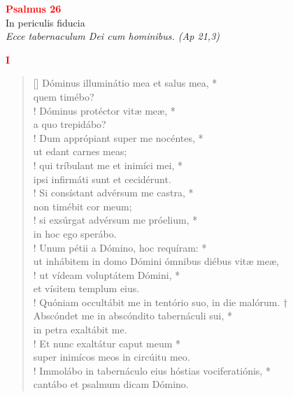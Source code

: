 


\def\greinitialformat#1{%
{\fontsize{39}{39}\selectfont #1}%
}




\vspace{0.3cm}
\begin{center}
 \textcolor{red}{\large \bf Psalmus 26}\\
In periculis fiducia\\
\textit{\small Ecce tabernaculum Dei cum hominibus. (Ap 21,3)}
\end{center}
\begin{center}
 \textcolor{red}{\bf I}
\end{center}
\begin{verse}[\versewidth]
Dóminus illuminátio mea et salus mea, *\\
quem timébo?\\!
\vin Dóminus protéctor vitæ meæ, *\\
\vin a quo trepidábo?\\!
Dum apprópiant super me nocéntes, *\\
ut edant carnes meas;\\!
\vin qui tríbulant me et inimíci mei, *\\
\vin ipsi infirmáti sunt et cecidérunt.\\!
Si consístant advérsum me castra, *\\
non timébit cor meum;\\!
\vin si exsúrgat advérsum me próelium, *\\
\vin in hoc ego sperábo.\\!
Unum pétii a Dómino, hoc requíram: *\\
ut inhábitem in domo Dómini ómnibus diébus vitæ meæ,\\!
\vin ut vídeam voluptátem Dómini, *\\
\vin et vísitem templum eius.\\!
Quóniam occultábit me in tentório suo, in die malórum. †\\
Abscóndet me in abscóndito tabernáculi sui, *\\
in petra exaltábit me.\\!
\vin Et nunc exaltátur caput meum *\\
\vin super inimícos meos in circúitu meo.\\!
Immolábo in tabernáculo eius hóstias vociferatiónis, *\\
cantábo et psalmum dicam Dómino.\\
\end{verse}
